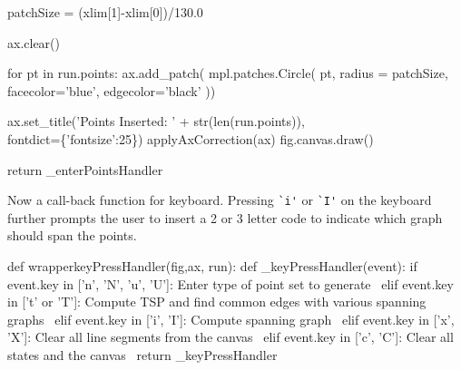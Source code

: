              patchSize  = (xlim[1]-xlim[0])/130.0
                   
             ax.clear()

             for pt in run.points:
                  ax.add_patch( mpl.patches.Circle( pt, radius = patchSize,
                                                    facecolor='blue', edgecolor='black'  ))

             ax.set_title('Points Inserted: ' + str(len(run.points)), \\
                           fontdict=\{'fontsize':25\})
             applyAxCorrection(ax)
             fig.canvas.draw()

    return _enterPointsHandler
\nwendcode{}\nwdocspar

Now a call-back function for keyboard. Pressing \verb|`i'| or \verb|`I'| on the keyboard further prompts the 
user to insert a 2 or 3 letter code to indicate which graph should span the points. 

\nwenddocs{}\plusendmoddef\nwstartdeflinemarkup{}\nwenddeflinemarkup
def wrapperkeyPressHandler(fig,ax, run): 
       def _keyPressHandler(event):
               if event.key in ['n', 'N', 'u', 'U']: 
                     \LA{}Enter type of point set to generate~{\nwtagstyle{}}\RA{}                   
               elif event.key in ['t' or 'T']:
                     \LA{}Compute TSP and find common edges with various spanning graphs~{\nwtagstyle{}}\RA{}
               elif event.key in ['i', 'I']:                     
                     \LA{}Compute spanning graph~{\nwtagstyle{}}\RA{}    
               elif event.key in ['x', 'X']:
                     \LA{}Clear all line segments from the canvas~{\nwtagstyle{}}\RA{}
               elif event.key in ['c', 'C']: 
                     \LA{}Clear all states and the canvas~{\nwtagstyle{}}\RA{}
       return _keyPressHandler
\nwendcode{}\nwdocspar

